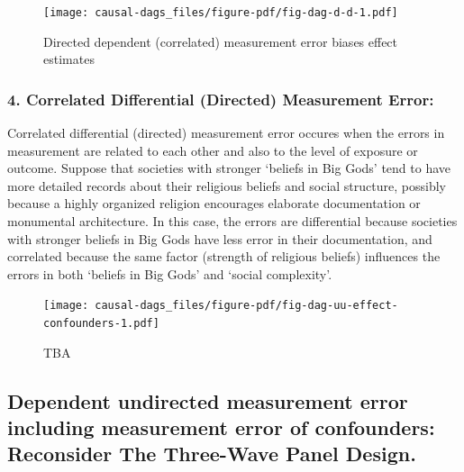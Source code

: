 \documentclass[
  singlecolumn]{report}
\begin{document}
\begin{figure}

{\centering \texttt{[image: causal-dags\_files/figure-pdf/fig-dag-d-d-1.pdf]}

}

\caption{\label{fig-dag-d-d}Directed dependent (correlated) measurement
error biases effect estimates}

\end{figure}

\hypertarget{correlated-differential-directed-measurement-error}{%
\subsubsection{\texorpdfstring{4. \textbf{Correlated Differential
(Directed) Measurement
Error:}}{4. Correlated Differential (Directed) Measurement Error:}}\label{correlated-differential-directed-measurement-error}}

Correlated differential (directed) measurement error occures when the
errors in measurement are related to each other and also to the level of
exposure or outcome. Suppose that societies with stronger `beliefs in
Big Gods' tend to have more detailed records about their religious
beliefs and social structure, possibly because a highly organized
religion encourages elaborate documentation or monumental architecture.
In this case, the errors are differential because societies with
stronger beliefs in Big Gods have less error in their documentation, and
correlated because the same factor (strength of religious beliefs)
influences the errors in both `beliefs in Big Gods' and `social
complexity'.

\begin{figure}

{\centering \texttt{[image: causal-dags\_files/figure-pdf/fig-dag-uu-effect-confounders-1.pdf]}

}

\caption{\label{fig-dag-uu-effect-confounders}TBA}

\end{figure}

\hypertarget{dependent-undirected-measurement-error-including-measurement-error-of-confounders-reconsider-the-three-wave-panel-design.}{%
\subsection{Dependent undirected measurement error including measurement
error of confounders: Reconsider The Three-Wave Panel
Design.}\label{dependent-undirected-measurement-error-including-measurement-error-of-confounders-reconsider-the-three-wave-panel-design.}}
\end{document}
